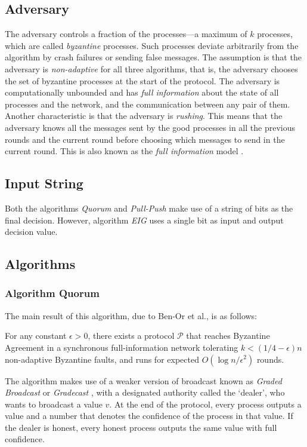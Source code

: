 \subsection{Adversary}
The adversary controls a fraction of the processes---a maximum of $k$ processes, which are called \textit{byzantine} processes. Such processes deviate arbitrarily from the algorithm by crash failures or sending false messages. The assumption is that the adversary is \textit{non-adaptive} for all three algorithms, that is, the adversary chooses the set of byzantine processes at the start of the protocol. The adversary is computationally unbounded and has \textit{full information} about the state of all processes and the network, and the communication between any pair of them. Another characteristic is that the adversary is \textit{rushing}. This means that the adversary knows all the messages sent by the good processes in all the previous rounds and the current round before choosing which messages to send in the current round. This is also known as the \textit{full information} model \cite{GGL98}.

\subsection{Input String}
Both the algorithms \textit{Quorum} and \textit{Pull-Push}  make use of a string of bits as the final decision. However, algorithm \textit{EIG} uses a single bit as input and output decision value.


\subsection{Algorithms}

\subsubsection{Algorithm Quorum\cite{BPV06}}
The main result of this algorithm, due to Ben-Or et al., is as follows:
\begin{theorem}
For any constant $\epsilon > 0$, there exists a protocol $\mathcal{P}$ that reaches Byzantine Agreement in a synchronous full-information network tolerating $k < (1/4 - \epsilon) n$ non-adaptive Byzantine faults, and runs for expected $O(\log n/\epsilon^2)$ rounds. 
\hfill\qedsymbol
\end{theorem}
The algorithm makes use of a weaker version of broadcast known as \textit{Graded Broadcast} or \textit{Gradecast} \cite{FM97}, with a designated authority called the `dealer', who wants to broadcast a value $v$. At the end of the protocol, every process outputs a value and a number that denotes the confidence of the process in that value. If the dealer is honest, every honest process outputs the same value with full confidence. 

